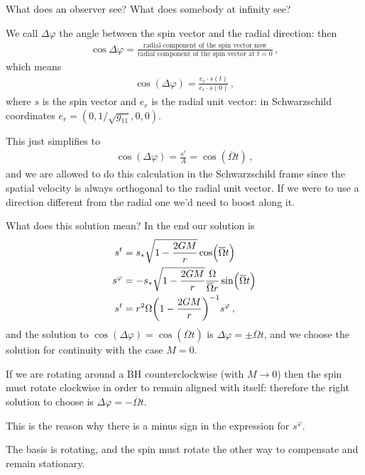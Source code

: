 \documentclass[main.tex]{subfiles}
\begin{document}
What does an observer see? What does somebody at infinity see? 

We call \(\Delta \varphi \) the angle between the spin vector and the radial direction: then 
%
\begin{align}
  \cos \Delta \varphi  = \frac{\text{radial component of the spin vector now}}{\text{radial component of the spin vector at }  t=0}
\,,
\end{align}
%
which means 
%
\begin{align}
  \cos(\Delta \varphi ) = \frac{e_{r} \cdot s (t)}{e_r \cdot s(0)}
\,,
\end{align}
%
where \(s\) is the spin vector and \(e_r\) is the radial unit vector: in Schwarzschild coordinates \(e_{r} = (0, 1/\sqrt{g_{11} } , 0, 0)\). 

This just simplifies to 
%
\begin{align}
  \cos(\Delta \varphi ) = \frac{s^{r}}{A} = \cos(\overline{\Omega}t)
\,,
\end{align}
%
and we are allowed to do this calculation in the Schwarzschild frame since the spatial velocity is always orthogonal to the radial unit vector. 
If we were to use a direction different from the radial one we'd need to boost along it.   

What does this solution mean? In the end our solution is 
%
\begin{subequations}
\begin{align}
  s^{t} &= s_{*} \sqrt{1 - \frac{2GM}{r}} \cos(\overline{\Omega} t)  \\
s^{\varphi } &= - s_{* } \sqrt{1 - \frac{2GM}{r}} \frac{\Omega}{\overline{\Omega} r} \sin(\overline{\Omega} t)  \\
 s^{t} &= r^{2} \Omega \qty(1 - \frac{2GM}{r})^{-1} s^{\varphi }
\,,
\end{align}
\end{subequations}
%
and the solution to \(\cos(\Delta \varphi ) = \cos(\overline{\Omega} t)\) is \(\Delta \varphi = \pm \overline{\Omega} t\), and we choose the solution for continuity with the case \(M=0\). 

If we are rotating around a BH counterclockwise (with \(M \rightarrow 0\)) then the spin must rotate clockwise in order to remain aligned with itself: therefore the right solution to choose is \(\Delta \varphi = - \overline{\Omega} t\). 

This is the reason why there is a minus sign in the expression for \(s^{\varphi } \). 

The basis is rotating, and the spin must rotate the other way to compensate and remain stationary. 
\end{document}
